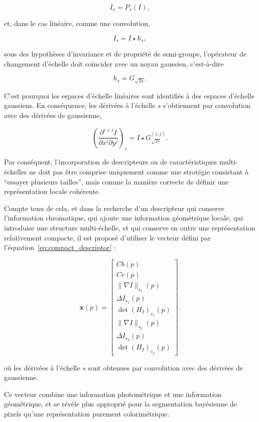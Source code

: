 \begin{equation}
I_s=P_s(I),
\label{eq:scale_operator}
\end{equation}

et, dans le cas linéaire, comme une convolution,

\begin{equation}
I_s=I\star h_s,
\label{eq:scale_convolution}
\end{equation}

sous des hypothèses d’invariance et de propriété de semi-groupe, l’opérateur de changement d’échelle doit coïncider avec un noyau gaussien, c’est-à-dire

\begin{equation}
h_s=G_{\sqrt{2s}}.
\label{eq:gaussian_kernel_scale}
\end{equation}

C’est pourquoi les espaces d’échelle linéaires sont identifiés à des espaces d’échelle gaussiens. En conséquence, les dérivées à l’échelle \(s\) s’obtiennent par convolution avec des dérivées de gaussienne,

\begin{equation}
\left(\frac{\partial^{i+j}I}{\partial x^i\partial y^j}\right)_s
=
I\star G^{(i,j)}_{\sqrt{2s}}.
\label{eq:scale_derivatives}
\end{equation}

Par conséquent, l’incorporation de descripteurs ou de caractéristiques multi-échelles ne doit pas être comprise uniquement comme une stratégie consistant à ``essayer plusieurs tailles'', mais comme la manière correcte de définir une représentation locale cohérente. 

Compte tenu de cela, et dans la recherche d’un descripteur qui conserve l’information chromatique, qui ajoute une information géométrique locale, qui introduise une structure multi-échelle, et qui conserve en outre une représentation relativement compacte, il est proposé d’utiliser le vecteur défini par l’équation~\eqref{eq:compact_descriptor} :

\begin{equation}
\mathbf{x}(p)=
\begin{bmatrix}
Cb(p)\\
Cr(p)\\
\|\nabla I\|_{s_1}(p)\\
\Delta I_{s_1}(p)\\
\det(H_I)_{s_1}(p)\\
\|\nabla I\|_{s_2}(p)\\
\Delta I_{s_2}(p)\\
\det(H_I)_{s_2}(p)
\end{bmatrix}.
\label{eq:compact_descriptor}
\end{equation}

où les dérivées à l’échelle $s$ sont obtenues par convolution avec des dérivées de gaussienne.

Ce vecteur combine une information photométrique et une information géométrique, et se révèle plus approprié pour la segmentation bayésienne de pixels qu’une représentation purement colorimétrique.